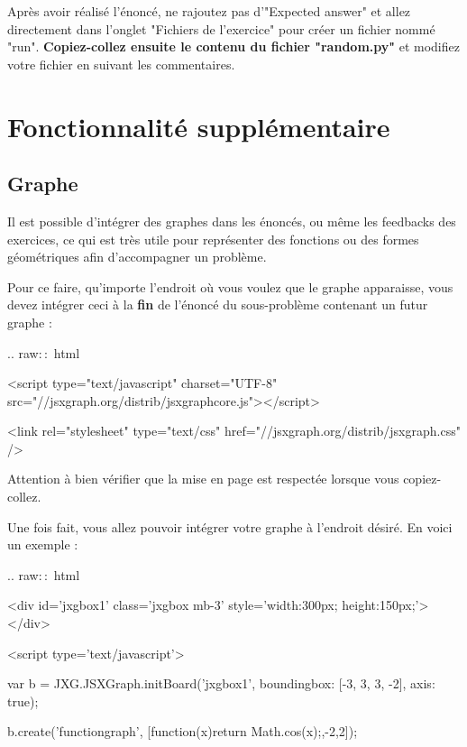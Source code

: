 \documentclass{article}
\begin{document}
Après avoir réalisé l'énoncé, ne rajoutez pas d'"Expected answer" et allez directement dans l'onglet "Fichiers de l'exercice" pour créer un fichier nommé "run". \textbf{Copiez-collez ensuite le contenu du fichier "random.py"} et modifiez votre fichier en suivant les commentaires.

\section{Fonctionnalité supplémentaire}

\subsection{Graphe}

Il est possible d'intégrer des graphes dans les énoncés, ou même les feedbacks des exercices, ce qui est très utile pour représenter des fonctions ou des formes géométriques afin d'accompagner un problème.
\bigskip

Pour ce faire, qu'importe l'endroit où vous voulez que le graphe apparaisse, vous devez intégrer ceci à la \textbf{fin} de l'énoncé du sous-problème contenant un futur graphe :
\bigskip

.. raw${::}$ html
\bigskip

\hspace{1cm}<script type="text/javascript" charset="UTF-8" src="//jsxgraph.org/distrib/jsxgraphcore.js"></script>

\hspace{1cm}<link rel="stylesheet" type="text/css" href="//jsxgraph.org/distrib/jsxgraph.css" />
\bigskip

Attention à bien vérifier que la mise en page est respectée lorsque vous copiez-collez.
\bigskip

Une fois fait, vous allez pouvoir intégrer votre graphe à l'endroit désiré. En voici un exemple :
\bigskip

.. raw${::}$ html
\bigskip

\hspace{1cm}<div id={\color{red}'jxgbox1'} class='jxgbox mb-3' style='width:300px; height:150px;'></div>

\hspace{1cm}<script type='text/javascript'>

\hspace{2cm}var b = JXG.JSXGraph.initBoard({\color{red}'jxgbox1'}, {boundingbox: [-3, 3, 3, -2], axis: true});

\hspace{2cm}b.create('functiongraph', [function(x){return Math.cos(x);},-2,2]);
\end{document}
